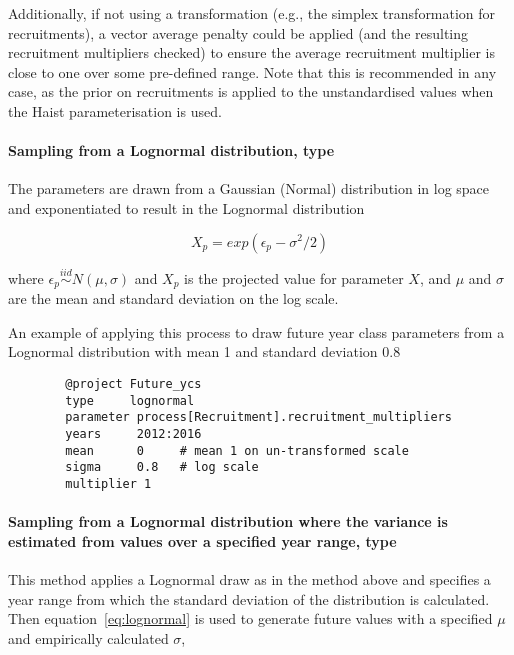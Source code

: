 Additionally, if not using a transformation (e.g., the simplex transformation for recruitments), a vector average penalty could be applied (and the resulting recruitment multipliers checked) to ensure the average recruitment multiplier is close to one over some pre-defined range. Note that this is recommended in any case, as the prior on recruitments is applied to the unstandardised values when the Haist parameterisation is used. 

\paragraph[Lognormal]{Sampling from a Lognormal distribution, type  }\label{sec:Project-LogNormal} 

The parameters are drawn from a Gaussian (Normal) distribution in log space and exponentiated  to result in the Lognormal distribution

\begin{equation}\label{eq:lognormal}
X_p = exp(\epsilon_p - \sigma^2 / 2)
\end{equation}

where $\epsilon_p\stackrel{iid}{\sim}N(\mu,\sigma)$ and $X_p$ is the projected value for parameter $X$, and $\mu$ and $\sigma$ are the mean and standard deviation on the log scale.

An example of applying this process to draw future year class parameters from a Lognormal distribution with mean 1 and standard deviation 0.8

{\small{\begin{verbatim}
		@project Future_ycs
		type     lognormal
		parameter process[Recruitment].recruitment_multipliers
		years     2012:2016
		mean      0     # mean 1 on un-transformed scale
		sigma     0.8   # log scale
		multiplier 1
		\end{verbatim}}}

\paragraph[Lognormal-Empirical]{Sampling from a Lognormal distribution where the  variance is estimated from values over a specified year range, type   }\label{sec:Project-LogNormalEmpirical} 

This method applies a Lognormal draw as in the  method above and specifies a year range from which the standard deviation of the distribution is calculated. Then equation~\eqref{eq:lognormal} is used to generate future values with a specified $\mu$ and empirically calculated $\sigma$,

